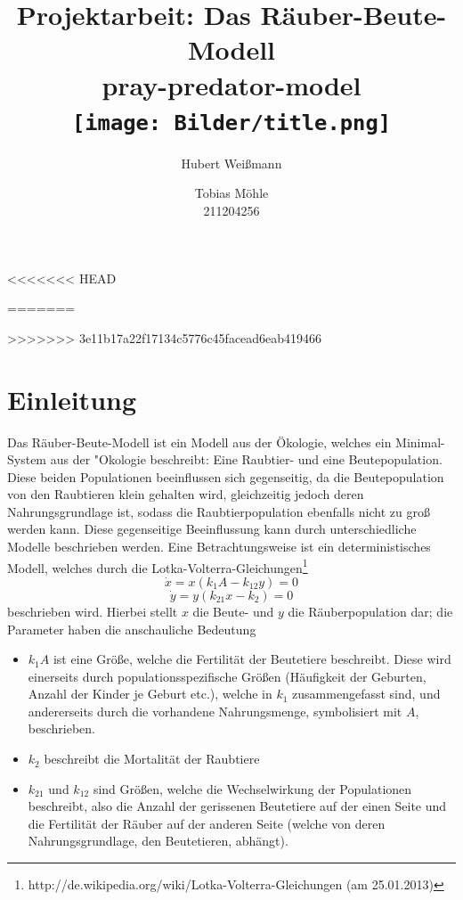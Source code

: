 \documentclass[11pt]{article}
\begin{document}
\begin{titlepage}
\title{\textbf{\Huge{Projektarbeit: Das Räuber-Beute-Modell}} \\ \large{pray-predator-model}\\ \texttt{[image: Bilder/title.png]}}
<<<<<<< HEAD
\author{Hubert Weißmann}
=======
\author{Tobias Möhle \\ 211204256}
>>>>>>> 3e11b17a22f17134c5776c45facead6eab419466
\maketitle
\end{titlepage}
\tableofcontents

\section{Einleitung}
Das Räuber-Beute-Modell ist ein Modell aus der Ökologie, welches ein Minimal-System aus der "Okologie beschreibt: Eine Raubtier- und eine Beutepopulation. Diese beiden Populationen beeinflussen sich gegenseitig, da die Beutepopulation von den Raubtieren klein gehalten wird, gleichzeitig jedoch deren Nahrungsgrundlage ist, sodass die Raubtierpopulation ebenfalls nicht zu groß werden kann. Diese gegenseitige Beeinflussung kann durch unterschiedliche Modelle beschrieben werden.
Eine Betrachtungsweise ist ein deterministisches Modell, welches durch die Lotka-Volterra-Gleichungen\footnote{http://de.wikipedia.org/wiki/Lotka-Volterra-Gleichungen (am 25.01.2013)}
$$\dot x=x(k_1 A-k_{12}y)=0$$
$$\dot y=y(k_{21}x-k_2)=0$$
beschrieben wird.
Hierbei stellt $x$ die Beute- und $y$ die Räuberpopulation dar; die Parameter haben die anschauliche Bedeutung
\begin{itemize}
   \item $k_1 A$ ist eine Größe, welche die Fertilität der Beutetiere beschreibt. Diese wird einerseits durch populationsspezifische Größen (Häufigkeit der Geburten, Anzahl der Kinder je Geburt etc.), welche in $k_1$ zusammengefasst sind, und andererseits durch die vorhandene Nahrungsmenge, symbolisiert mit $A$, beschrieben.
   \item $k_2$ beschreibt die Mortalität der Raubtiere
   \item $k_{21}$ und $k_{12}$ sind Größen, welche die Wechselwirkung der Populationen beschreibt, also die Anzahl der gerissenen Beutetiere auf der einen Seite und die Fertilität der Räuber auf der anderen Seite (welche von deren Nahrungsgrundlage, den Beutetieren, abhängt).
\end{itemize}
\end{document}
